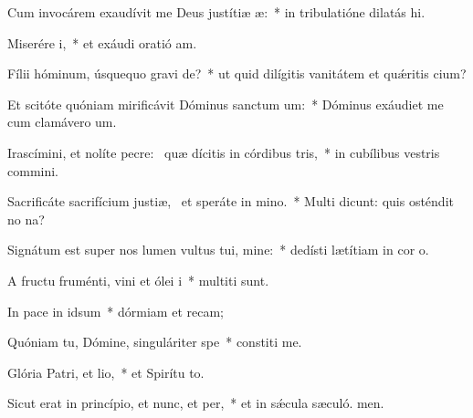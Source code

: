 \item Cum invocárem exaudívit me Deus justítiæ æ:~* in tribulatióne dilatás hi.
\item Miserére i,~* et exáudi oratió am.
\item Fílii hóminum, úsquequo gravi de?~* ut quid dilígitis vanitátem et quǽritis cium?
\item Et scitóte quóniam mirificávit Dóminus sanctum um:~* Dóminus exáudiet me cum clamávero  um.
\item Irascímini, et nolíte pecre:~\pscross{} quæ dícitis in córdibus tris,~* in cubílibus vestris commini.
\item Sacrificáte sacrifícium justiæ,~\pscross{} et speráte in mino.~* Multi dicunt: quis osténdit no na?
\item Signátum est super nos lumen vultus tui, mine:~* dedísti lætítiam in cor o.
\item A fructu fruménti, vini et ólei i~* multiti sunt.
\item In pace in idsum~* dórmiam et recam;
\item Quóniam tu, Dómine, singuláriter  spe~* constiti me.
\item Glória Patri, et lio,~* et Spirítu to.
\item Sicut erat in princípio, et nunc, et per,~* et in sǽcula sæculó. men.
